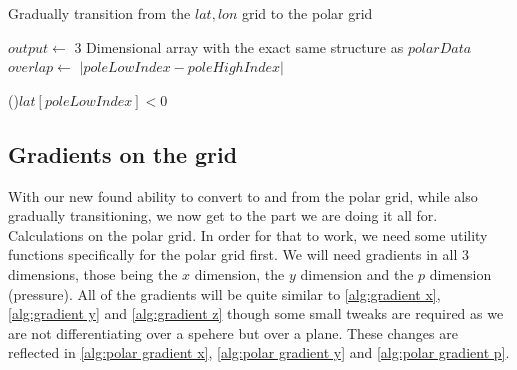 \begin{algorithm}[htb]
    \caption{Gradually transition from the $lat, lon$ grid to the polar grid}
    \label{alg:polar interpolation}
    $output \leftarrow$ 3 Dimensional array with the exact same structure as $polarData$ \;
    $overlap \leftarrow $ $|poleLowIndex - poleHighIndex|$ \;
    
    \BlankLine
    \uIf(){$lat[poleLowIndex] < 0$}{
        \DontPrintSemicolon
        \PrintSemicolon
    } 

    \BlankLine
\end{algorithm}

\subsection{Gradients on the grid}
With our new found ability to convert to and from the polar grid, while also gradually transitioning, we now get to the part we are doing it all for. Calculations on the polar grid. In order for
that to work, we need some utility functions specifically for the polar grid first. We will need gradients in all 3 dimensions, those being the $x$ dimension, the $y$ dimension and the $p$ 
dimension (pressure). All of the gradients will be quite similar to \autoref{alg:gradient x}, \autoref{alg:gradient y} and \autoref{alg:gradient z} though some small tweaks are required as we 
are not differentiating over a spehere but over a plane. These changes are reflected in \autoref{alg:polar gradient x}, \autoref{alg:polar gradient y} and \autoref{alg:polar gradient p}.

